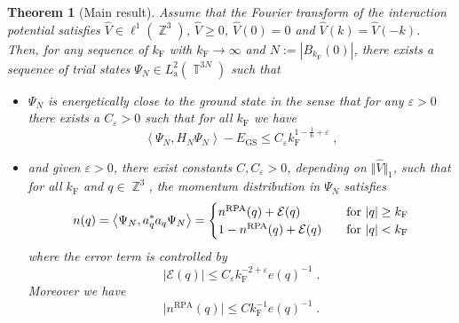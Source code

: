\documentclass[12pt,a4paper]{article}
\numberwithin{equation}{section}
\newcommand{\cE}{\mathcal{E}}
\newcommand{\1}{\mathbb{I}}
\newcommand{\F}{\mathrm{F}}
\newcommand{\GS}{\mathrm{GS}}
\newcommand{\RPA}{\mathrm{RPA}}
\DeclareMathOperator{\Z}{\mathbb{Z}}
\DeclareMathOperator{\T}{\mathbb{T}}
\newcommand{\eva}[1]{\left\langle #1 \right\rangle}
\theoremstyle{plain}
\newtheorem{theorem}{Theorem}[section]
\theoremstyle{definition}
\theoremstyle{remark}
\theoremstyle{plain}
\theoremstyle{definition}
\theoremstyle{remark}
\begin{document}
\begin{theorem}[Main result] \label{thm:main}
Assume that the Fourier transform of the interaction potential satisfies $ \hat{V} \in \ell^1(\Z^3) $, $ \hat{V} \ge 0 $, $ \hat{V}(0) = 0 $  and $ \hat{V}(k) = \hat{V}(-k) $.
Then, for any sequence of $ k_{\F} $ with $ k_{\F} \to \infty $ and $ N := |B_{k_{\F}}(0)| $, there exists a sequence of trial states  $ \Psi_N \in L^2_{\mathrm{a}}(\T^{3N}) $ such that
\begin{itemize}
\item $ \Psi_N $ is energetically close to the ground state in the sense that for any $ \varepsilon > 0 $ there exists a $ C_\varepsilon > 0 $ such that for all $ k_{\F} $ we have
\begin{equation} \label{eq:main1}
	\eva{\Psi_N, H_N \Psi_N} - E_{\GS}
	\le C_\varepsilon k_{\F}^{1-\frac 16 + \varepsilon} \;,
\end{equation}
\item and given $ \varepsilon > 0 $, there exist constants $ C, C_\varepsilon > 0 $, depending on $ \Vert \hat{V} \Vert_1 $, such that for all $ k_{\F} $ and $ q \in \Z^3 $, the momentum distribution in $ \Psi_N $ satisfies
\begin{equation} \label{eq:main2}
	n(q) = \eva{\Psi_N, a_q^* a_q \Psi_N}
	= \begin{cases}
	n^{\RPA}(q) + \cE(q) & \quad
		\textnormal{for } |q| \ge k_{\F} \\
	1 - n^{\RPA}(q) + \cE(q) & \quad
		\textnormal{for } |q| < k_{\F} 
	\end{cases}
\end{equation}
where the error term is controlled by
\begin{equation}
	\lvert \cE(q)\rvert \le C_\varepsilon k_{\F}^{-2 +\varepsilon} e(q)^{-1} \;.
\end{equation}
Moreover we have 
\begin{equation}
\lvert n^{\RPA}(q)\rvert \le C k_{\F}^{-1} e(q)^{-1} \;.
\end{equation}
\end{itemize} 
\end{theorem}
\end{document}
